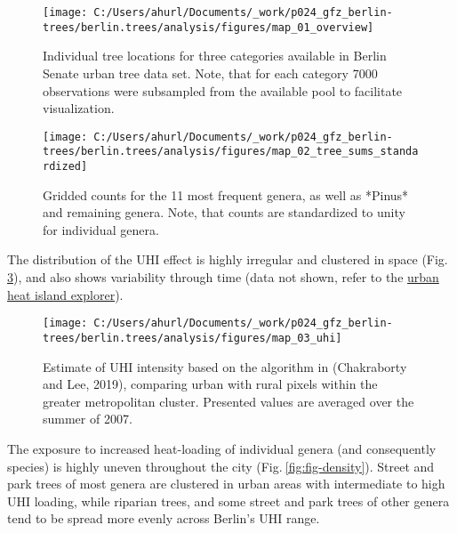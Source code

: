 \documentclass[
]{article}
\begin{document}
\begin{figure}

{\centering \texttt{[image: C:/Users/ahurl/Documents/\_work/p024\_gfz\_berlin-trees/berlin.trees/analysis/figures/map\_01\_overview]} 

}

\caption{Individual tree locations for three categories available in Berlin Senate urban tree data set. Note, that for each category 7000 observations were subsampled from the available pool to facilitate visualization.}\label{fig:fig-tree-overview-map}
\end{figure}

\begin{figure}

{\centering \texttt{[image: C:/Users/ahurl/Documents/\_work/p024\_gfz\_berlin-trees/berlin.trees/analysis/figures/map\_02\_tree\_sums\_standardized]} 

}

\caption{Gridded counts for the 11 most frequent genera, as well as *Pinus* and remaining genera. Note, that counts are standardized to unity for individual genera.}\label{fig:fig-tree-count-map}
\end{figure}

The distribution of the UHI effect is highly irregular and clustered in space (Fig.\(~\)\ref{fig:fig-uhi-map}), and also shows variability through time (data not shown, refer to the \href{https://yceo.users.earthengine.app/view/uhimap}{urban heat island explorer}).



\begin{figure}

{\centering \texttt{[image: C:/Users/ahurl/Documents/\_work/p024\_gfz\_berlin-trees/berlin.trees/analysis/figures/map\_03\_uhi]} 

}

\caption{Estimate of UHI intensity based on the algorithm in (Chakraborty and Lee, 2019), comparing urban with rural pixels within the greater metropolitan cluster. Presented values are averaged over the summer of 2007.}\label{fig:fig-uhi-map}
\end{figure}

The exposure to increased heat-loading of individual genera (and consequently species) is highly uneven throughout the city (Fig.\(~\)\ref{fig:fig-density}).
Street and park trees of most genera are clustered in urban areas with intermediate to high UHI loading, while riparian trees, and some street and park trees of other genera tend to be spread more evenly across Berlin's UHI range.
\end{document}
